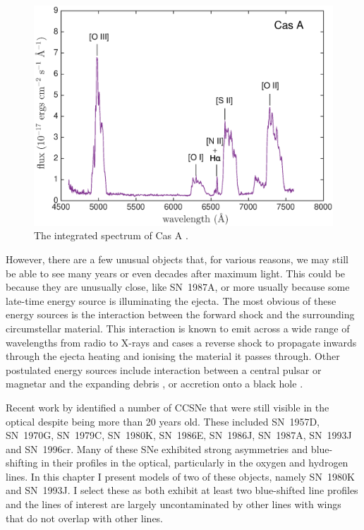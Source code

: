 \begin{figure}
\centering
\includegraphics[clip=true,scale=0.6, trim=30 0 50 20]{chapters/chapter6/figs/CasA/spectrum}
\caption{The integrated spectrum of Cas A \citep{Milisavljevic2013}.}
\label{CasA_spectrum}
\end{figure}

However, there are a few unusual objects that, for various reasons, we may still be able to see many years or even decades after maximum light.  This could be because they are unusually close, like SN~1987A, or more usually because some late-time energy source is illuminating the ejecta.  The most obvious of these energy sources is the interaction between the forward shock and the surrounding circumstellar material.  This interaction is known to emit across a wide range of wavelengths from radio to X-rays and cases a reverse shock to propagate inwards through the ejecta heating and ionising the material it passes through.  Other postulated energy sources include interaction between a central pulsar or magnetar and the expanding debris \citep{Woosley2010}, or accretion onto a black hole \citep{Patnaude2001}.

Recent work by \citep{Milisavljevic2012} identified a number of CCSNe that were still visible in the optical despite being more than 20 years old.  These included SN~1957D, SN~1970G, SN~1979C, SN~1980K, SN~1986E, SN~1986J, SN~1987A, SN~1993J and SN~1996cr.  Many of these SNe exhibited strong asymmetries and blue-shifting in their profiles in the optical, particularly in the oxygen and hydrogen lines.  In this chapter I present models of two of these objects, namely SN~1980K and SN~1993J.  I select these as both exhibit at least two blue-shifted line profiles and the lines of interest are largely uncontaminated by other lines with wings that do not overlap with other lines.  

